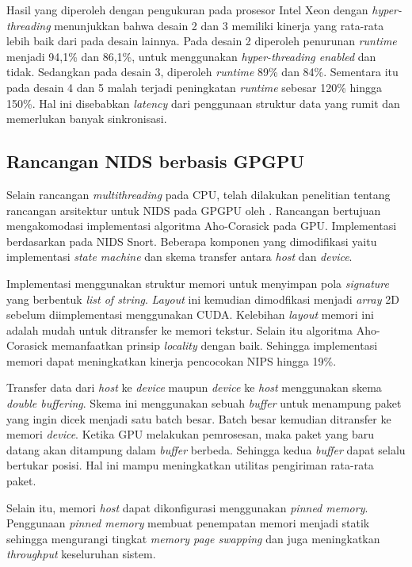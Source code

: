     Hasil yang diperoleh dengan pengukuran pada prosesor Intel Xeon dengan \emph{hyper-threading} menunjukkan bahwa desain 2 dan 3 memiliki kinerja yang rata-rata lebih baik dari pada desain lainnya. Pada desain 2 diperoleh penurunan \emph{runtime} menjadi 94,1\% dan 86,1\%, untuk menggunakan \emph{hyper-threading enabled} dan tidak. Sedangkan pada desain 3, diperoleh \emph{runtime} 89\% dan 84\%. Sementara itu pada desain 4 dan 5 malah terjadi peningkatan \emph{runtime} sebesar 120\% hingga 150\%. Hal ini disebabkan \emph{latency} dari penggunaan struktur data yang rumit dan memerlukan banyak sinkronisasi.

  \subsection{Rancangan NIDS berbasis GPGPU}

    Selain rancangan \emph{multithreading} pada CPU, telah dilakukan penelitian tentang rancangan arsitektur untuk NIDS pada GPGPU oleh \cite{gnort2008}. Rancangan bertujuan mengakomodasi implementasi algoritma Aho-Corasick pada GPU. Implementasi berdasarkan pada NIDS Snort. Beberapa komponen yang dimodifikasi yaitu implementasi \emph{state machine} dan skema transfer antara \emph{host} dan \emph{device}. 

    Implementasi menggunakan struktur memori untuk menyimpan pola \emph{signature} yang berbentuk \emph{list of string}. \emph{Layout} ini kemudian dimodfikasi menjadi \emph{array} 2D sebelum diimplementasi menggunakan CUDA. Kelebihan \emph{layout} memori ini adalah mudah untuk ditransfer ke memori tekstur. Selain itu algoritma Aho-Corasick memanfaatkan prinsip \emph{locality} dengan baik. Sehingga implementasi memori dapat meningkatkan kinerja pencocokan NIPS hingga 19\%.

    Transfer data dari \emph{host} ke \emph{device} maupun \emph{device} ke \emph{host} menggunakan skema \emph{double buffering}. Skema ini menggunakan sebuah \emph{buffer} untuk menampung paket yang ingin dicek menjadi satu batch besar. Batch besar kemudian ditransfer ke memori \emph{device}. Ketika GPU melakukan pemrosesan, maka paket yang baru datang akan ditampung dalam \emph{buffer} berbeda. Sehingga kedua \emph{buffer} dapat selalu bertukar posisi. Hal ini mampu meningkatkan utilitas pengiriman rata-rata paket. 
    
    Selain itu, memori \emph{host} dapat dikonfigurasi menggunakan \emph{pinned memory}. Penggunaan \emph{pinned memory} membuat penempatan memori menjadi statik sehingga mengurangi tingkat \emph{memory page swapping} dan juga meningkatkan \emph{throughput} keseluruhan sistem.

